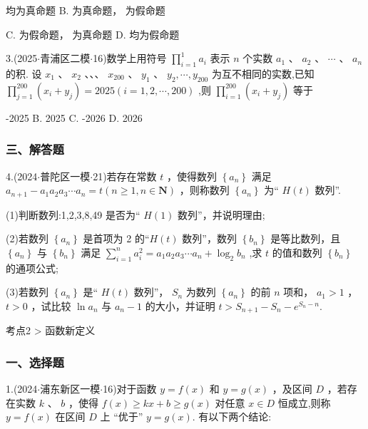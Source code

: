 \xx{}{}{}{}    均为真命题 B.   为真命题，  为假命题

C.   为假命题，  为真命题 D.     均为假命题



3.(2025$\cdot$青浦区二模$\cdot$16)数学上用符号 $\mathop{\prod }\limits_{{i = 1}}^{1}{a}_{i}$ 表示 $n$ 个实数 ${a}_{1}$ 、 ${a}_{2}$ 、 $\cdots$ 、 ${a}_{n}$ 的积. 设 ${x}_{1}$ 、 ${x}_{2}$ 、、、 ${x}_{200}$ 、 ${y}_{1}$ 、 ${y}_{2},\cdots ,{y}_{200}$ 为互不相同的实数,已知 $\mathop{\prod }\limits_{{j = 1}}^{{200}}\left( {{x}_{i} + {y}_{j}}\right)  = {2025}\left( {i = 1,2,\cdots ,{200}}\right)$ ,则 $\mathop{\prod }\limits_{{i = 1}}^{{200}}\left( {{x}_{i} + {y}_{j}}\right)$ 等于 \dotfill{(\kh{})}

\xx{}{}{}{}-2025 B. 2025 C. -2026 D. 2026

\subsubsection*{三、解答题}

4.(2024$\cdot$普陀区一模$\cdot$21)若存在常数 $t$ ，使得数列 $\left\{  {a}_{n}\right\}$ 满足 ${a}_{n + 1} - {a}_{1}{a}_{2}{a}_{3}\cdots {a}_{n} = t\left( {n \geq  1,n \in  \mathbf{N}}\right)$ ，则称数列 $\left\{  {a}_{n}\right\}$ 为“ $H\left( t\right)$ 数列”.

(1)判断数列:1,2,3,8,49 是否为“ $H\left( 1\right)$ 数列”，并说明理由;

(2)若数列 $\left\{  {a}_{n}\right\}$ 是首项为 2 的“$H\left( t\right)$ 数列”，数列 $\left\{  {b}_{n}\right\}$ 是等比数列，且 $\left\{  {a}_{n}\right\}$ 与 $\left\{  {b}_{n}\right\}$ 满足 $\mathop{\sum }\limits_{{i = 1}}^{n}{a}_{i}^{2} =  {a}_{1}{a}_{2}{a}_{3}\cdots {a}_{n} + {\log }_{2}{b}_{n}$ ,求 $t$ 的值和数列 $\left\{  {b}_{n}\right\}$ 的通项公式;

(3)若数列 $\left\{  {a}_{n}\right\}$ 是“ $H\left( t\right)$ 数列”， ${S}_{n}$ 为数列 $\left\{  {a}_{n}\right\}$ 的前 $n$ 项和， ${a}_{1} > 1$ ， $t > 0$ ，试比较 $\ln {a}_{n}$ 与 ${a}_{n} - 1$ 的大小，并证明 $t > {S}_{n + 1} - {S}_{n} - {{e}}^{{S}_{n} - n}$.

考点2 > 函数新定义

\subsubsection*{一、选择题}

1.(2024$\cdot$浦东新区一模$\cdot$16)对于函数 $y = f\left( x\right)$ 和 $y = g\left( x\right)$ ，及区间 $D$ ，若存在实数 $k$ 、 $b$ ，使得 $f\left( x\right)  \geq  {kx} + b \geq  g\left( x\right)$ 对任意 $x \in  D$ 恒成立,则称 $y = f\left( x\right)$ 在区间 $D$ 上 “优于” $y = g\left( x\right)$. 有以下两个结论:

